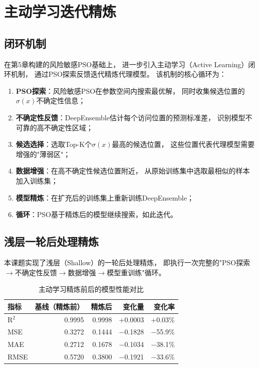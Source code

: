 \section{主动学习迭代精炼}

\subsection{闭环机制}

在第5章构建的风险敏感PSO基础上，
进一步引入主动学习（Active Learning）闭环机制，
通过PSO探索反馈迭代精炼代理模型。
该机制的核心循环为：

\begin{enumerate}
    \item \textbf{PSO探索}：风险敏感PSO在参数空间内搜索最优解，
        同时收集候选位置的$\sigma(x)$不确定性信息；
    \item \textbf{不确定性反馈}：DeepEnsemble估计每个访问位置的预测标准差，
        识别模型不可靠的高不确定性区域；
    \item \textbf{候选选择}：选取Top-K个$\sigma(x)$最高的候选位置，
        这些位置代表代理模型需要增强的"薄弱区"；
    \item \textbf{数据增强}：在高不确定性候选位置附近，
        从原始训练集中选取最相似的样本加入训练集；
    \item \textbf{模型精炼}：在扩充后的训练集上重新训练DeepEnsemble；
    \item \textbf{循环}：PSO基于精炼后的模型继续搜索，如此迭代。
\end{enumerate}

\subsection{浅层一轮后处理精炼}

本课题实现了浅层（Shallow）的一轮后处理精炼，
即执行一次完整的"PSO探索$\to$不确定性反馈$\to$数据增强$\to$模型重训练"循环。

\begin{table}[H]
\centering
\caption{主动学习精炼前后的模型性能对比}
\begin{tabular}{lrrrr}
\toprule
指标 & 基线（精炼前） & 精炼后 & 变化量 & 变化率 \\
\midrule
R$^2$ & 0.9995 & 0.9998 & +0.0003 & +0.03\% \\
MSE & 0.3272 & 0.1444 & $-$0.1828 & $-$55.9\% \\
MAE & 0.2712 & 0.1678 & $-$0.1034 & $-$38.1\% \\
RMSE & 0.5720 & 0.3800 & $-$0.1921 & $-$33.6\% \\
\bottomrule
\end{tabular}
\label{tab:al_metrics}
\end{table}

